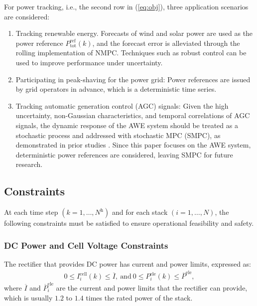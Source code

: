 \documentclass[review,3p,10pt]{elsarticle}
\begin{document}
For power tracking, i.e., the second row in (\ref{eq:obj}), three application scenarios are considered:
\begin{enumerate}
  \item{Tracking renewable energy.} Forecasts of wind and solar power are used as the power reference $P_{\text{tot}}^{\text{ref}}(k)$, and the forecast error is alleviated through the rolling implementation of NMPC.
      Techniques such as robust control \cite{li2024two} %
      can be used to improve performance under uncertainty.

  \item{Participating in peak-shaving for the power grid: Power references are issued by grid operators in advance, which is a deterministic time series. }

  \item{ Tracking automatic generation control (AGC) signals}: Given the high uncertainty, non-Gaussian characteristics, and temporal correlations of AGC signals, the dynamic response of the AWE system should be treated as a stochastic process and addressed with stochastic MPC (SMPC), as demonstrated in prior studies \cite{qiu2021continuous,qiu2020stochastic}. Since this paper focuses on the AWE system, deterministic power references are considered, leaving SMPC for future research.
\end{enumerate}


\subsection{Constraints}
\label{eq:constraints}

At each time step $(k = 1,\ldots, N^\text{h})$ and for each stack $(i=1,\ldots,N)$, the following constraints must be satisfied to ensure operational feasibility and safety.

\subsubsection{DC Power and Cell Voltage Constraints}

The rectifier that provides DC power has current and power limits, 
expressed as:
\begin{gather}
  0 \le I_i^\text{cell}(k) \le \overline{I}, \ \text{and} \  %
  0 \le P^\text{ele}_i(k) \le \overline{P}^\text{ele}, \label{eq:limitdcpower}
\end{gather}
\noindent
where $\overline{I}$ and $\overline{P}^\text{ele}_i$ are the current and power limits that the rectifier can provide, which is usually $1.2$ to $1.4$ times the rated power of the stack. %
\end{document}

